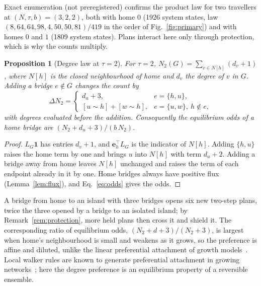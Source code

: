 \documentclass[aps,pre,preprint,superscriptaddress,nofootinbib]{revtex4-2}
\newtheorem{proposition}{Proposition}
\theoremstyle{definition}
\theoremstyle{remark}
\begin{document}
Exact enumeration (not preregistered) confirms the product law for two travellers at $(N,\tau,b)=(3,2,2)$, both with home $0$ (1926 system states, law $(8,64,64,98,4,50,50,81)/419$ in the order of Fig.~\ref{fig:primary}) and with homes $0$ and $1$ (1809 system states). Plans interact here only through protection, which is why the counts multiply.

\begin{proposition}[Degree law at $\tau=2$]
\label{prop:homebridge}
For $\tau=2$, $N_2(G)=\sum_{v\in N[h]}(d_v+1)$, where $N[h]$ is the closed neighbourhood of home and $d_v$ the degree of $v$ in $G$. Adding a bridge $e\notin G$ changes the count by
\begin{equation}
  \Delta N_2=
  \begin{cases}
    d_u+3, & e=\{h,u\},\\
    [u\sim h]+[w\sim h], & e=\{u,w\},\ h\notin e,
  \end{cases}
\end{equation}
with degrees evaluated before the addition. Consequently the equilibrium odds of a home bridge are $(N_2+d_u+3)/(b\,N_2)$.
\end{proposition}
\begin{proof}
$L_G\mathbf 1$ has entries $d_v+1$, and $\mathbf e_h^\top L_G$ is the indicator of $N[h]$. Adding $\{h,u\}$ raises the home term by one and brings $u$ into $N[h]$ with term $d_u+2$. Adding a bridge away from home leaves $N[h]$ unchanged and raises the term of each endpoint already in it by one. Home bridges always have positive flux (Lemma~\ref{lem:flux}), and Eq.~\eqref{eq:odds} gives the odds.
\end{proof}

A bridge from home to an island with three bridges opens six new two-step plans, twice the three opened by a bridge to an isolated island; by Remark~\ref{rem:protection}, more held plans then cross it and shield it. The corresponding ratio of equilibrium odds, $(N_2+d+3)/(N_2+3)$, is largest when home's neighbourhood is small and weakens as it grows, so the preference is affine and diluted, unlike the linear preferential attachment of growth models~\cite{BarabasiAlbert1999}. Local walker rules are known to generate preferential attachment in growing networks~\cite{Vazquez2003,SaramakiKaski2004}; here the degree preference is an equilibrium property of a reversible ensemble.
\end{document}
